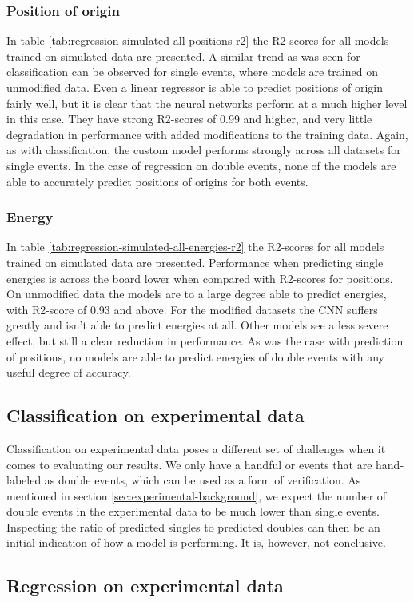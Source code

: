 \subsubsection{Position of origin}
In table \ref{tab:regression-simulated-all-positions-r2} the R2-scores for all models
trained on simulated data are presented. A similar trend as was seen for classification
can be observed for single events, where models are trained on unmodified data. Even
a linear regressor is able to predict positions of origin fairly well, but it is clear
that the neural networks perform at a much higher level in this case. They have strong
R2-scores of 0.99 and higher, and very little degradation in performance with added 
modifications to the training data. Again, as with classification, the custom model
performs strongly across all datasets for single events.
In the case of regression on double events, none of the models are able to accurately
predict positions of origins for both events.

\subsubsection{Energy}
In table \ref{tab:regression-simulated-all-energies-r2} the R2-scores for all models
trained on simulated data are presented.
Performance when predicting single energies is across the board lower when compared with
R2-scores for positions. On unmodified data the models are to a large degree able to
predict energies, with R2-score of 0.93 and above. For the modified datasets the CNN
suffers greatly and isn't able to predict energies at all. Other models see a less
severe effect, but still a clear reduction in performance.
As was the case with prediction of positions, no models are able to predict energies
of double events with any useful degree of accuracy.


\subsection{Classification on experimental data}
Classification on experimental data poses a different set of challenges when it comes
to evaluating our results. We only have a handful or events that are hand-labeled as
double events, which can be used as a form of verification. As mentioned in section
\ref{sec:experimental-background}, we expect the number of double events in the experimental
data to be much lower than single events. Inspecting the ratio of predicted singles to predicted
doubles can then be an initial indication of how a model is performing. It is, however,
not conclusive.


\subsection{Regression on experimental data}

